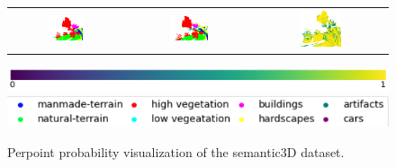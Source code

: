 \begin{figure}[h!]
\begin{tabular}{ccc}
            \includegraphics[width=0.33\textwidth, height=0.18\textheight]{images/seg_output/sem3d_seg_output/3_GT.png} &
            \includegraphics[width=0.33\textwidth, height=0.18\textheight]{images/seg_output/sem3d_seg_output/3_Pred.png}& 
            \includegraphics[width=0.33\textwidth, height=0.18\textheight]{images/seg_output/sem3d_seg_output/3_max_prob.png}\\
        \end{tabular}
        \includegraphics[scale=0.45]{images/prob_legend.pdf}
        \includegraphics[scale=0.65]{images/legend.png}
        \caption{Perpoint probability visualization of the semantic3D dataset.}
        \label{fig:de_sem3d_probmap}
    \end{figure}

